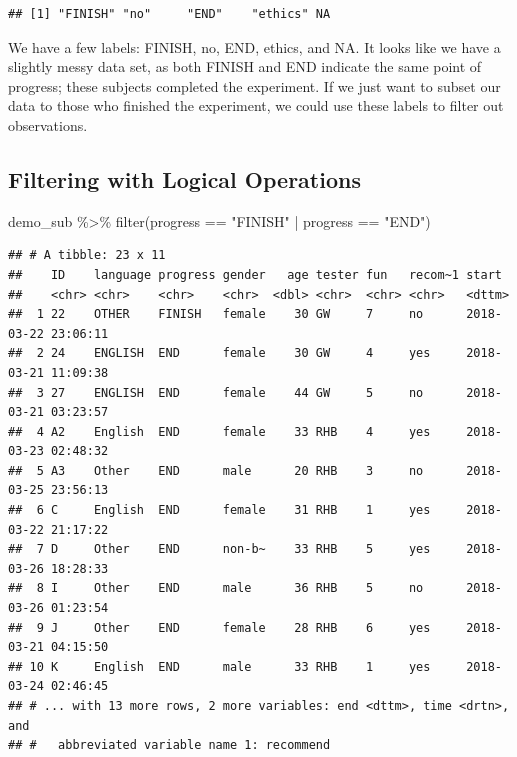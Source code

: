 \documentclass[
]{book}
\newenvironment{Shaded}{\begin{snugshade}}{\end{snugshade}}
\newcommand{\FunctionTok}[1]{\textcolor[rgb]{0.00,0.00,0.00}{#1}}
\newcommand{\NormalTok}[1]{#1}
\newcommand{\SpecialCharTok}[1]{\textcolor[rgb]{0.00,0.00,0.00}{#1}}
\newcommand{\StringTok}[1]{\textcolor[rgb]{0.31,0.60,0.02}{#1}}
\begin{document}
\begin{Shaded}
\end{Shaded}

\begin{verbatim}
## [1] "FINISH" "no"     "END"    "ethics" NA
\end{verbatim}

We have a few labels: FINISH, no, END, ethics, and NA. It looks like we have a slightly messy data set, as both FINISH and END indicate the same point of progress; these subjects completed the experiment. If we just want to subset our data to those who finished the experiment, we could use these labels to filter out observations.

\hypertarget{filtering-with-logical-operations}{%
\subsection{Filtering with Logical Operations}\label{filtering-with-logical-operations}}

\begin{Shaded}
\begin{Highlighting}[]
\NormalTok{demo\_sub }\SpecialCharTok{\%\textgreater{}\%} \FunctionTok{filter}\NormalTok{(progress }\SpecialCharTok{==} \StringTok{"FINISH"} \SpecialCharTok{|}\NormalTok{ progress }\SpecialCharTok{==} \StringTok{"END"}\NormalTok{)}
\end{Highlighting}
\end{Shaded}

\begin{verbatim}
## # A tibble: 23 x 11
##    ID    language progress gender   age tester fun   recom~1 start              
##    <chr> <chr>    <chr>    <chr>  <dbl> <chr>  <chr> <chr>   <dttm>             
##  1 22    OTHER    FINISH   female    30 GW     7     no      2018-03-22 23:06:11
##  2 24    ENGLISH  END      female    30 GW     4     yes     2018-03-21 11:09:38
##  3 27    ENGLISH  END      female    44 GW     5     no      2018-03-21 03:23:57
##  4 A2    English  END      female    33 RHB    4     yes     2018-03-23 02:48:32
##  5 A3    Other    END      male      20 RHB    3     no      2018-03-25 23:56:13
##  6 C     English  END      female    31 RHB    1     yes     2018-03-22 21:17:22
##  7 D     Other    END      non-b~    33 RHB    5     yes     2018-03-26 18:28:33
##  8 I     Other    END      male      36 RHB    5     no      2018-03-26 01:23:54
##  9 J     Other    END      female    28 RHB    6     yes     2018-03-21 04:15:50
## 10 K     English  END      male      33 RHB    1     yes     2018-03-24 02:46:45
## # ... with 13 more rows, 2 more variables: end <dttm>, time <drtn>, and
## #   abbreviated variable name 1: recommend
\end{verbatim}
\end{document}
